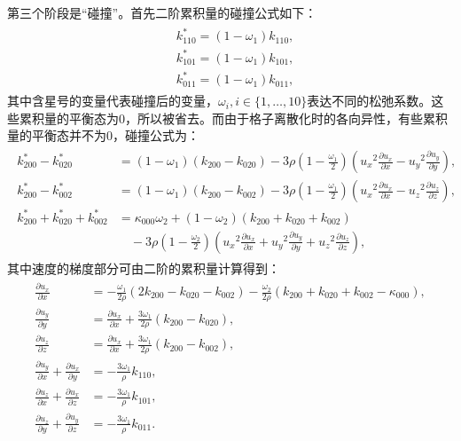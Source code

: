 第三个阶段是“碰撞”。首先二阶累积量的碰撞公式如下：
\begin{align}
    \begin{split}
& k_{110}^{*}=\left(1-\omega_{1}\right) k_{110}, \\
& k_{101}^{*}=\left(1-\omega_{1}\right) k_{101}, \\
& k_{011}^{*}=\left(1-\omega_{1}\right) k_{011} ,
\end{split}
\end{align}
其中含星号的变量代表碰撞后的变量，$\omega_{i}, i \in \{1,\dots,10\}$表达不同的松弛系数。这些累积量的平衡态为0，所以被省去。而由于格子离散化时的各向异性，有些累积量的平衡态并不为0，碰撞公式为：
\begin{align}
    \begin{split}
k_{200}^{*}-k_{020}^{*} & =\left(1-\omega_{1}\right)\left(k_{200}-k_{020}\right)-3 \rho\left(1-\frac{\omega_{1}}{2}\right)\left({u_x}^{2} \frac{\partial u_x}{\partial x}-{u_y}^{2} \frac{\partial u_y}{\partial y}\right), \\
k_{200}^{*}-k_{002}^{*} & =\left(1-\omega_{1}\right)\left(k_{200}-k_{002}\right)-3 \rho\left(1-\frac{\omega_{1}}{2}\right)\left({u_x}^{2} \frac{\partial u_x}{\partial x}-{u_z}^{2} \frac{\partial u_z}{\partial z}\right), \\
k_{200}^{*}+k_{020}^{*}+k_{002}^{*} & =\kappa_{000} \omega_{2}+\left(1-\omega_{2}\right)\left(k_{200}+k_{020}+k_{002}\right) \\
&\quad -3 \rho\left(1-\frac{\omega_{2}}{2}\right)\left({u_x}^{2} \frac{\partial u_x}{\partial x}+{u_y}^{2} \frac{\partial u_y}{\partial y}+{u_z}^{2} \frac{\partial u_z}{\partial z}\right) ,
\end{split}
\end{align}
其中速度的梯度部分可由二阶的累积量计算得到：
\begin{align}
    \begin{split}
\frac{\partial u_x}{\partial x} & =-\frac{\omega_{1}}{2 \rho}\left(2 k_{200}-k_{020}-k_{002}\right)-\frac{\omega_{2}}{2 \rho}\left(k_{200}+k_{020}+k_{002}-\kappa_{000}\right), \\
\frac{\partial u_y}{\partial y} & =\frac{\partial u_x}{\partial x}+\frac{3 \omega_{1}}{2 \rho}\left(k_{200}-k_{020}\right), \\
\frac{\partial u_z}{\partial z} & =\frac{\partial u_x}{\partial x}+\frac{3 \omega_{1}}{2 \rho}\left(k_{200}-k_{002}\right), \\
\frac{\partial u_y}{\partial x}+\frac{\partial u_x}{\partial y} & =-\frac{3 \omega_{1}}{\rho} k_{110}, \\
\frac{\partial u_z}{\partial x}+\frac{\partial u_x}{\partial z} & =-\frac{3 \omega_{1}}{\rho} k_{101}, \\
\frac{\partial u_z}{\partial y}+\frac{\partial u_y}{\partial z} & =-\frac{3 \omega_{1}}{\rho} k_{011}.
\end{split}
\end{align}
